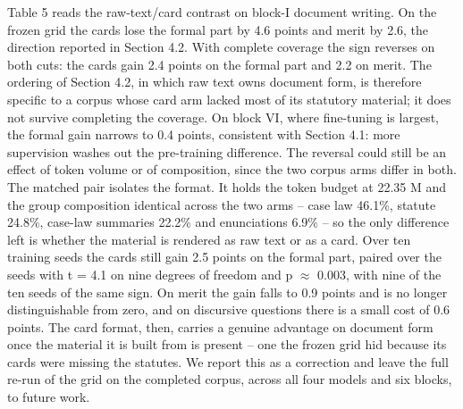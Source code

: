 \documentclass{IOS-Book-Article}
\begin{document}
Table 5 reads the raw-text/card contrast on block-I document writing. On the frozen grid the cards lose the formal part by 4.6 points and merit by 2.6, the direction reported in Section 4.2. With complete coverage the sign reverses on both cuts: the cards gain 2.4 points on the formal part and 2.2 on merit. The ordering of Section 4.2, in which raw text owns document form, is therefore specific to a corpus whose card arm lacked most of its statutory material; it does not survive completing the coverage. On block VI, where fine-tuning is largest, the formal gain narrows to 0.4 points, consistent with Section 4.1: more supervision washes out the pre-training difference.
The reversal could still be an effect of token volume or of composition, since the two corpus arms differ in both. The matched pair isolates the format. It holds the token budget at 22.35 M and the group composition identical across the two arms -- case law 46.1\%, statute 24.8\%, case-law summaries 22.2\% and enunciations 6.9\% -- so the only difference left is whether the material is rendered as raw text or as a card. Over ten training seeds the cards still gain 2.5 points on the formal part, paired over the seeds with t = 4.1 on nine degrees of freedom and p $\approx$ 0.003, with nine of the ten seeds of the same sign. On merit the gain falls to 0.9 points and is no longer distinguishable from zero, and on discursive questions there is a small cost of 0.6 points. The card format, then, carries a genuine advantage on document form once the material it is built from is present -- one the frozen grid hid because its cards were missing the statutes. We report this as a correction and leave the full re-run of the grid on the completed corpus, across all four models and six blocks, to future work.
\end{document}
